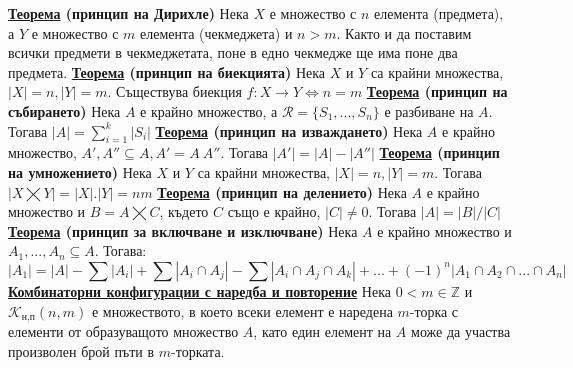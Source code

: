 \documentclass{article}
\begin{document}
\textbf{\underline{Теорема} (принцип на Дирихле)} \newline
Нека $X$ е множество с $n$ елемента (предмета), а $Y$ е множество с $m$ елемента (чекмеджета) и $n > m$. Както и да поставим
всички предмети в чекмеджетата, поне в едно чекмедже ще има поне два предмета. \newline\newline
\textbf{\underline{Теорема} (принцип на биекцията)} \newline
Нека $X$ и $Y$ са крайни множества, $|X| = n, |Y| = m$. Съществува биекция $f : X \rightarrow Y \iff n = m$ \newline\newline
\textbf{\underline{Теорема} (принцип на събирането)} \newline
Нека $A$ е крайно множество, а $\mathcal{R} = \{S_1, ..., S_n\}$ е разбиване на $A$. Тогава $|A| = \sum_{i = 1}^{k}|S_i|$ \newline\newline
\textbf{\underline{Теорема} (принцип на изваждането)} \newline
Нека $A$ е крайно множество, $A', A'' \subseteq A, A' = A \ A''$. Тогава $|A'| = |A| - |A''|$ \newline\newline
\textbf{\underline{Теорема} (принцип на умножението)} \newline
Нека $X$ и $Y$ са крайни множества, $|X| = n, |Y| = m$. Тогава $|X \bigtimes Y| = |X| . |Y| = nm$ \newline\newline
\textbf{\underline{Теорема} (принцип на делението)} \newline
Нека $A$ е крайно множество и $B = A \bigtimes C$, където $C$ също е крайно, $|C| \neq 0$. 
Тогава $|A| = |B| / |C|$ \newline\newline
\textbf{\underline{Теорема} (принцип за включване и изключване)} \newline
Нека $A$ е крайно множество и $A_1, ..., A_n \subseteq A$. Тогава:
$$|A_1| = |A| - \sum|A_i| + \sum|A_i \cap A_j| - \sum|A_i \cap A_j \cap A_k| + ... + (-1)^n|A_1 \cap A_2 \cap ... \cap A_n|$$
\textbf{\underline{Комбинаторни конфигурации с наредба и повторение}} \newline\newline
Нека $0 < m \in \mathbb{Z}$ и $\mathcal{K}_{\text{н,п}}(n, m)$ е множеството, в което всеки елемент е наредена $m$-торка с
елементи от образуващото множество $A$, като един елемент на $A$ може да участва произволен брой пъти в $m$-торката.
\end{document}
